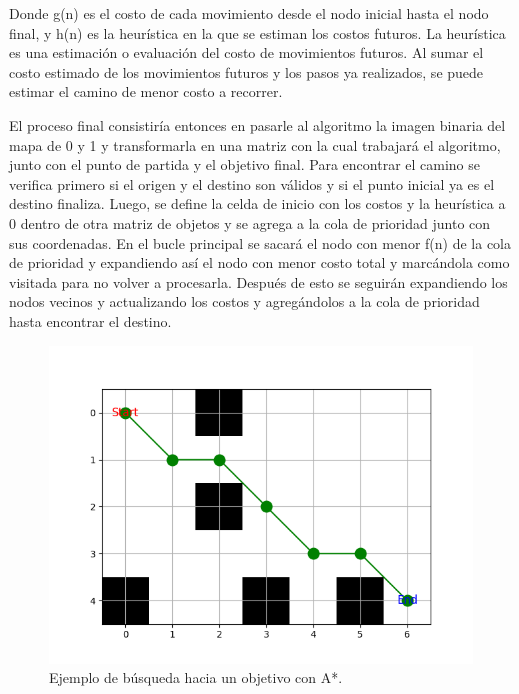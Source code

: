 Donde g(n) es el costo de cada movimiento desde el nodo inicial hasta el nodo final, y h(n) es la
heurística en la que se estiman los costos futuros. La heurística es una estimación o evaluación del costo de
movimientos futuros. Al sumar el costo estimado de los movimientos futuros y los pasos ya realizados, se puede estimar el camino de menor costo a recorrer.


El proceso final consistiría entonces en pasarle al algoritmo la imagen binaria del mapa de 0 y 1 y transformarla en una matriz con la cual trabajará el algoritmo, junto con el punto de partida y el objetivo final. Para encontrar el camino se verifica primero si el origen y el destino son válidos y si el punto inicial ya es el destino finaliza. Luego, se define la celda de inicio con los costos y la heurística a 0 dentro de otra matriz de objetos y se agrega a la cola de prioridad junto con sus coordenadas. En el bucle principal se sacará el nodo con menor f(n) de la cola de prioridad y expandiendo así el nodo con menor costo total y marcándola como visitada para no volver a procesarla. Después de esto se seguirán expandiendo los nodos vecinos y actualizando los costos y agregándolos a la cola de prioridad hasta encontrar el destino.

\begin{figure}[H]
  \centering
  \includegraphics[scale=0.6]{figs/astar4} %
  \caption{ Ejemplo de búsqueda hacia un objetivo con A*.}
  \label{fig:mel}
\end{figure}


